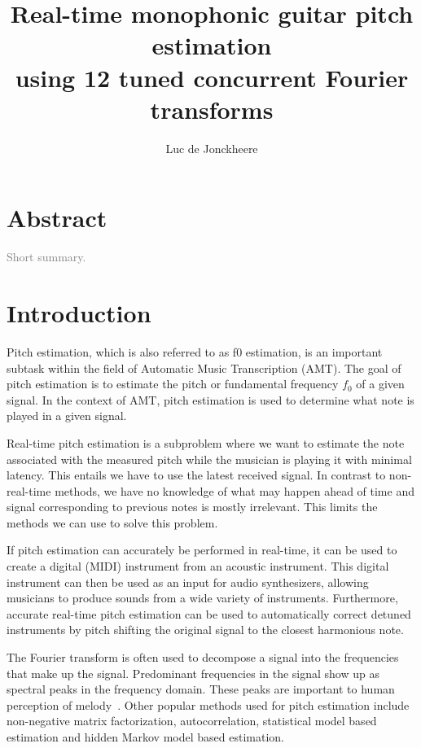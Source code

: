 \documentclass[10pt,twocolumn]{article}
\title{\textbf{Real-time monophonic guitar pitch estimation\\using 12 tuned concurrent Fourier transforms}}
\author{Luc de Jonckheere}
\begin{document}

\maketitle


\section*{Abstract}
\textcolor{gray}{Short summary.}


\tableofcontents


\section{Introduction}
Pitch estimation, which is also referred to as f0 estimation, is an important subtask within the field of Automatic Music Transcription (AMT). The goal of pitch estimation is to estimate the pitch or fundamental frequency $f_0$ of a given signal. In the context of AMT, pitch estimation is used to determine what note is played in a given signal.

Real-time pitch estimation is a subproblem where we want to estimate the note associated with the measured pitch while the musician is playing it with minimal latency. This entails we have to use the latest received signal. In contrast to non-real-time methods, we have no knowledge of what may happen ahead of time and signal corresponding to previous notes is mostly irrelevant. This limits the methods we can use to solve this problem.

If pitch estimation can accurately be performed in real-time, it can be used to create a digital (MIDI) instrument from an acoustic instrument. This digital instrument can then be used as an input for audio synthesizers, allowing musicians to produce sounds from a wide variety of instruments. Furthermore, accurate real-time pitch estimation can be used to automatically correct detuned instruments by pitch shifting the original signal to the closest harmonious note.

The Fourier transform is often used to decompose a signal into the frequencies that make up the signal. Predominant frequencies in the signal show up as spectral peaks in the frequency domain. These peaks are important to human perception of melody~\cite{hearing}. %
Other popular methods used for pitch estimation include non-negative matrix factorization, autocorrelation, statistical model based estimation and hidden Markov model based estimation.
\end{document}
